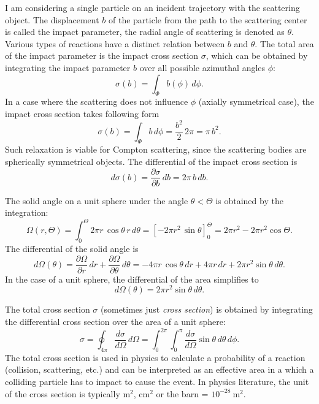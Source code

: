 \documentclass[a4paper,11pt,titlepage,twoside]{book}
\newcommand{\unit}[2]{$#1~\ensuremath{\mathrm{#2}}$}
\begin{document}
I am considering a single particle on an incident trajectory with the scattering object.
The displacement $b$ of the particle from the path to the scattering center is called the impact parameter, the radial angle of scattering is denoted as $\theta$.
Various types of reactions have a distinct relation between $b$ and $\theta$.
The total area of the impact parameter is the impact cross section $\sigma$, which can be obtained by integrating the impact parameter $b$ over all possible azimuthal angles $\phi$:
\begin{equation}
  \sigma\left(b\right) = \int_\Phi b\left(\phi\right)\,d\phi.
\end{equation}
In a case where the scattering does not influence $\phi$ (axially symmetrical case), the impact cross section takes following form
\begin{equation}
  \sigma\left(b\right) = \int_\Phi b\,d\phi = \frac{b^{2}}{2}\,2\pi = \pi\,b^2.
\end{equation}
Such relaxation is viable for Compton scattering, since the scattering bodies are spherically symmetrical objects.
The differential of the impact cross section is
\begin{equation}
  d\sigma\left(b\right) = \frac{\partial \sigma}{\partial b}\,db = 2\pi\,b\,db.
\end{equation}

The solid angle on a unit sphere under the angle $\theta < \Theta$ is obtained by the integration:
\begin{equation}
  \Omega\left(r, \Theta\right) = \int_0^\Theta 2\pi r\,\cos\theta\,r\,d\theta = \left[-2\pi r^2\,\sin\theta\right]_0^\Theta = 2\pi r^2 - 2\pi r^2\cos\Theta.
\end{equation}
The differential of the solid angle is
\begin{equation}
  d\Omega\left(\theta\right) = \frac{\partial \Omega}{\partial r}\,dr + \frac{\partial \Omega}{\partial \theta}\,d\theta = -4\pi r\,\cos\theta\,dr + 4\pi r\,dr + 2\pi r^2\sin\theta\,d\theta.
\end{equation}
In the case of a unit sphere, the differential of the area simplifies to
\begin{equation}
  d\Omega(\theta) = 2\pi r^2\sin\theta\,d\theta.
\end{equation}

The total cross section $\sigma$ (sometimes just \emph{cross section}) is obtained by integrating the differential cross section over the area of a unit sphere:
\begin{equation}
  \sigma = \oint_{4\pi} \frac{d\sigma}{d\Omega}\,d\Omega = \int_0^{2\pi} \int_0^{\pi} \frac{d\sigma}{d\Omega}\sin\theta\,d\theta\,d\phi.
\end{equation}
The total cross section is used in physics to calculate a probability of a reaction (collision, scattering, etc.) and can be interpreted as an effective area in a which a colliding particle has to impact to cause the event.
In physics literature, the unit of the cross section is typically $\mathrm{m}^2$, $\mathrm{cm}^2$ or the barn = \unit{10^{-28}}{m^2}.
\end{document}
